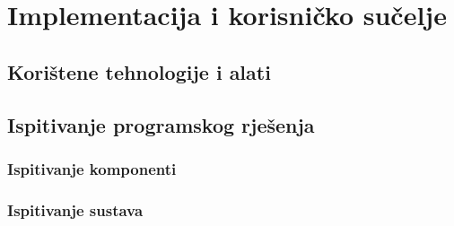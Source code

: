 \chapter{Implementacija i korisničko sučelje}
		
		
		\section{Korištene tehnologije i alati}
		
			
			
			
			\eject 
		
	
		\section{Ispitivanje programskog rješenja}
			
			
	
			
			\subsection{Ispitivanje komponenti}
			
			
			
			\subsection{Ispitivanje sustava}
			
